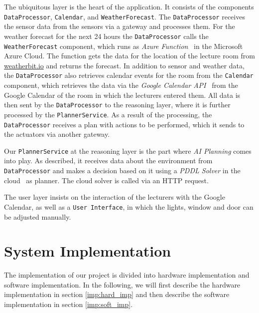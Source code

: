 \documentclass[runningheads]{llncs}
\begin{document}
The ubiquitous layer is the heart of the application.
It consists of the components \texttt{DataProcessor}, \texttt{Calendar}, and \texttt{WeatherForecast}.
The \texttt{DataProcessor} receives the sensor data from the sensors via a gateway and processes them.
For the weather forecast for the next 24 hours the \texttt{DataProcessor} calls the \texttt{WeatherForecast} component, which runs as \textit{Azure Function}~\cite{AzureFun50:online} in the Microsoft Azure Cloud.
The function gets the data for the location of the lecture room from \url{weatherbit.io} and returns the forecast.
In addition to sensor and weather data, the \texttt{DataProcessor} also retrieves calendar events for the room from the \texttt{Calendar} component, which retrieves the data via the \textit{Google Calendar API}~\cite{APIRefer59:online} from the Google Calendar of the room in which the lecturers entered them.
All data is then sent by the \texttt{DataProcessor} to the reasoning layer, where it is further processed by the \texttt{PlannerService}.
As a result of the processing, the \texttt{DataProcessor} receives a plan with actions to be performed, which it sends to the actuators via another gateway.

Our \texttt{PlannerService} at the reasoning layer is the part where \textit{AI Planning} comes into play. 
As described, it receives data about the environment from \texttt{DataProcessor} and makes a decision based on it using a \textit{PDDL Solver} in the cloud~\cite{solverpl71:online} as planner.
The cloud solver is called via an HTTP request. 

The user layer insists on the interaction of the lecturers with the Google Calendar, as well as a \texttt{User Interface}, in which the lights, window and door can be adjusted manually.


\section{System Implementation}
\label{sec:imp}
The implementation of our project is divided into hardware implementation and software implementation. In the following, we will first describe the hardware implementation in section \ref{imp:hard_imp} and then describe the software implementation in section \ref{imp:soft_imp}.
\end{document}
